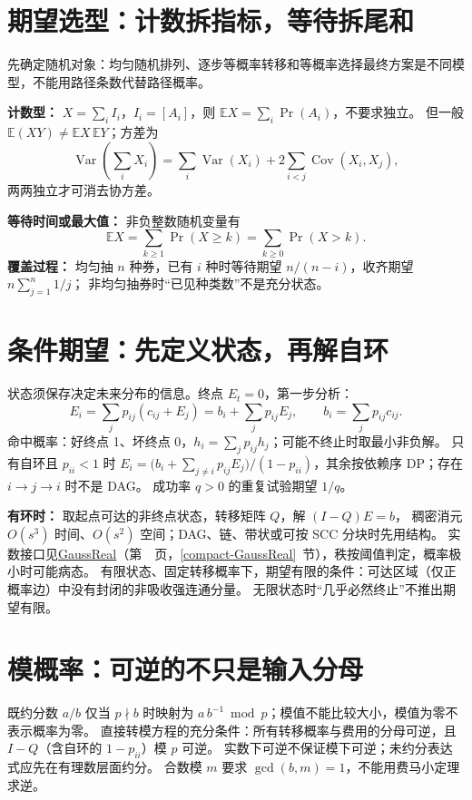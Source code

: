 \section{期望选型：计数拆指标，等待拆尾和}\label{knowledge-expectation}
先确定随机对象：均匀随机排列、逐步等概率转移和等概率选择最终方案是不同模型，不能用路径条数代替路径概率。

\textbf{计数型：} $X=\sum_iI_i$，$I_i=[A_i]$，则 $\mathbb E X=\sum_i\Pr(A_i)$，不要求独立。
但一般 $\mathbb E(XY)\ne\mathbb E X\,\mathbb E Y$；方差为
\[
\operatorname{Var}\!\left(\sum_iX_i\right)
=\sum_i\operatorname{Var}(X_i)+2\sum_{i<j}\operatorname{Cov}(X_i,X_j),
\]
两两独立才可消去协方差。

\textbf{等待时间或最大值：} 非负整数随机变量有
\[
\mathbb E X=\sum_{k\ge1}\Pr(X\ge k)=\sum_{k\ge0}\Pr(X>k).
\]
\textbf{覆盖过程：} 均匀抽 $n$ 种券，已有 $i$ 种时等待期望 $n/(n-i)$，收齐期望 $n\sum_{j=1}^n1/j$；
非均匀抽券时“已见种类数”不是充分状态。

\section{条件期望：先定义状态，再解自环}\label{knowledge-probability-dp}
状态须保存决定未来分布的信息。终点 $E_t=0$，第一步分析：
\[
E_i=\sum_jp_{ij}(c_{ij}+E_j)=b_i+\sum_jp_{ij}E_j,
\qquad b_i=\sum_jp_{ij}c_{ij}.
\]
命中概率：好终点 1、坏终点 0，$h_i=\sum_jp_{ij}h_j$；可能不终止时取最小非负解。
只有自环且 $p_{ii}<1$ 时
$E_i=\bigl(b_i+\sum_{j\ne i}p_{ij}E_j\bigr)/(1-p_{ii})$，其余按依赖序 DP；存在 $i\to j\to i$ 时不是 DAG。
成功率 $q>0$ 的重复试验期望 $1/q$。

\textbf{有环时：} 取起点可达的非终点状态，转移矩阵 $Q$，解 $(I-Q)E=b$，
稠密消元 $O(s^3)$ 时间、$O(s^2)$ 空间；DAG、链、带状或可按 SCC 分块时先用结构。
实数接口见\hyperref[compact-GaussReal]{GaussReal}（第~\pageref{compact-GaussReal}~页，\ref{compact-GaussReal}~节），秩按阈值判定，概率极小时可能病态。
有限状态、固定转移概率下，期望有限的条件：可达区域（仅正概率边）中没有封闭的非吸收强连通分量。
无限状态时“几乎必然终止”不推出期望有限。

\section{模概率：可逆的不只是输入分母}\label{knowledge-mod-probability}
既约分数 $a/b$ 仅当 $p\nmid b$ 时映射为 $a\,b^{-1}\bmod p$；模值不能比较大小，模值为零不表示概率为零。
直接转模方程的充分条件：所有转移概率与费用的分母可逆，且 $I-Q$（含自环的 $1-p_{ii}$）模 $p$ 可逆。
实数下可逆不保证模下可逆；未约分表达式应先在有理数层面约分。
合数模 $m$ 要求 $\gcd(b,m)=1$，不能用费马小定理求逆。

